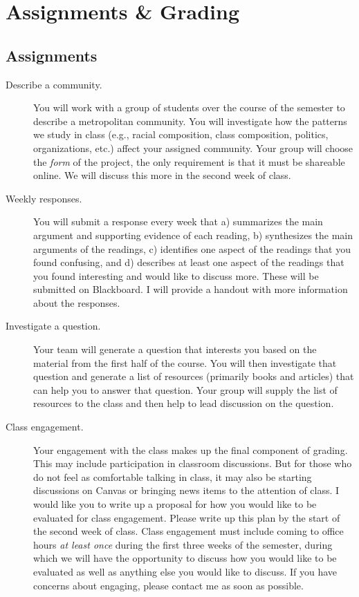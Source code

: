\documentclass[11pt]{syllabus}
\begin{document}


\section{Assignments \& Grading}
\subsection{Assignments}
\begin{description}
\item[Describe a community.] You will work with a group of students over the course of the semester to describe a metropolitan community. You will investigate how the patterns we study in class (e.g., racial composition, class composition, politics, organizations, etc.) affect your assigned community. Your group will choose the \emph{form} of the project, the only requirement is that it must be shareable online. We will discuss this more in the second week of class. 

\item[Weekly responses.] You will submit a response every week that a) summarizes the main argument and supporting evidence of each reading, b) synthesizes the main arguments of the readings, c) identifies one aspect of the readings that you found confusing, and d) describes at least one aspect of the readings that you found interesting and would like to discuss more. These will be submitted on Blackboard. I will provide a handout with more information about the responses. 

\item[Investigate a question.] Your team will generate a question that interests you based on the material from the first half of the course. You will then investigate that question and generate a list of resources (primarily books and articles) that can help you to answer that question. Your group will supply the list of resources to the class and then help to lead discussion on the question. 

\item[Class engagement.] Your engagement with the class makes up the final component of grading. This may include participation in classroom discussions. But for those who do not feel as comfortable talking in class, it may also be starting discussions on Canvas or bringing news items to the attention of class. I would like you to write up a proposal for how you would like to be evaluated for class engagement. Please write up this plan by the start of the second week of class. Class engagement must include coming to office hours \emph{at least once} during the first three weeks of the semester, during which we will have the opportunity to discuss how you would like to be evaluated as well as anything else you would like to discuss. If you have concerns about engaging, please contact me as soon as possible. 

\end{description}
\end{document}
